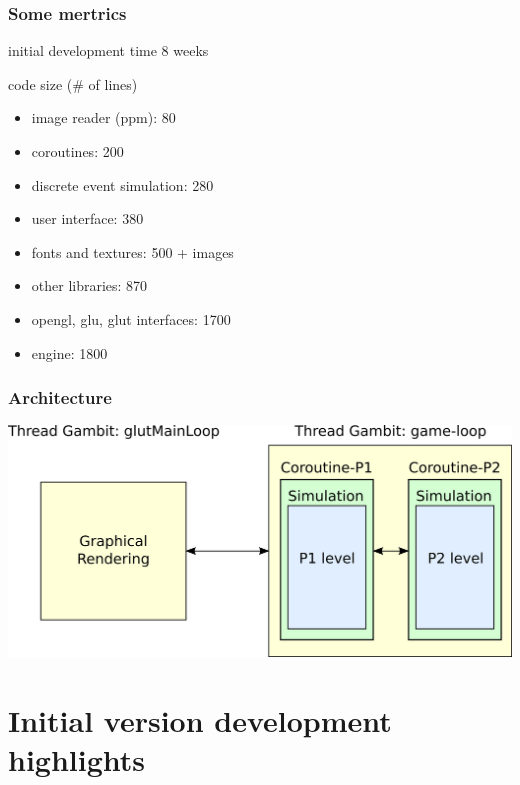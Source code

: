 \documentclass{beamer}
\newcommand{\<}[1]{\`#1}
\begin{document}
\begin{frame}
  \frametitle{Some mertrics}

  \begin{block}{initial development time}
    8 weeks
  \end{block}

  \begin{block}{code size (\# of lines)}
    \begin{itemize}
    \item image reader (ppm): 80
    \item coroutines: 200
    \item discrete event simulation: 280
    \item user interface: 380
    \item fonts and textures: 500 + images
    \item other libraries: 870
    \item opengl, glu, glut interfaces: 1700
    \item \alert{engine: 1800}
    \end{itemize}
  \end{block}
\end{frame}

\begin{frame}
  \frametitle{Architecture}
  \includegraphics[scale=0.7]{arch-en}
\end{frame}



\section{Initial version development highlights}
\end{document}
